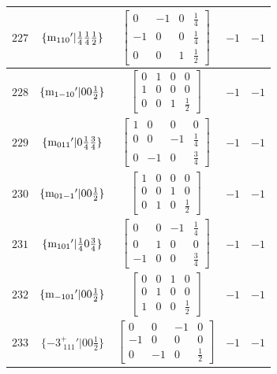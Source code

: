 \documentclass[fleqn,8pt]{jsarticle}
\begin{document}
\begin{longtable}{ccccc}
$ 227 $ & $ \{{\rm m}_{110}{}'|\frac{1}{4} \frac{1}{4} \frac{1}{2}\} $ & $ \begin{bmatrix} 0 & -1 & 0 & \frac{1}{4} \\ -1 & 0 & 0 & \frac{1}{4} \\ 0 & 0 & 1 & \frac{1}{2} \end{bmatrix} $ & $ -1 $ & $ -1 $ \\ \hline
$ 228 $ & $ \{{\rm m}_{1-10}{}'|0 0 \frac{1}{2}\} $ & $ \begin{bmatrix} 0 & 1 & 0 & 0 \\ 1 & 0 & 0 & 0 \\ 0 & 0 & 1 & \frac{1}{2} \end{bmatrix} $ & $ -1 $ & $ -1 $ \\ \hline
$ 229 $ & $ \{{\rm m}_{011}{}'|0 \frac{1}{4} \frac{3}{4}\} $ & $ \begin{bmatrix} 1 & 0 & 0 & 0 \\ 0 & 0 & -1 & \frac{1}{4} \\ 0 & -1 & 0 & \frac{3}{4} \end{bmatrix} $ & $ -1 $ & $ -1 $ \\ \hline
$ 230 $ & $ \{{\rm m}_{01-1}{}'|0 0 \frac{1}{2}\} $ & $ \begin{bmatrix} 1 & 0 & 0 & 0 \\ 0 & 0 & 1 & 0 \\ 0 & 1 & 0 & \frac{1}{2} \end{bmatrix} $ & $ -1 $ & $ -1 $ \\ \hline
$ 231 $ & $ \{{\rm m}_{101}{}'|\frac{1}{4} 0 \frac{3}{4}\} $ & $ \begin{bmatrix} 0 & 0 & -1 & \frac{1}{4} \\ 0 & 1 & 0 & 0 \\ -1 & 0 & 0 & \frac{3}{4} \end{bmatrix} $ & $ -1 $ & $ -1 $ \\ \hline
$ 232 $ & $ \{{\rm m}_{-101}{}'|0 0 \frac{1}{2}\} $ & $ \begin{bmatrix} 0 & 0 & 1 & 0 \\ 0 & 1 & 0 & 0 \\ 1 & 0 & 0 & \frac{1}{2} \end{bmatrix} $ & $ -1 $ & $ -1 $ \\ \hline
$ 233 $ & $ \{-3^{+}_{\,\,111}{}'|0 0 \frac{1}{2}\} $ & $ \begin{bmatrix} 0 & 0 & -1 & 0 \\ -1 & 0 & 0 & 0 \\ 0 & -1 & 0 & \frac{1}{2} \end{bmatrix} $ & $ -1 $ & $ -1 $ \\ \hline

\end{longtable}
\end{document}
